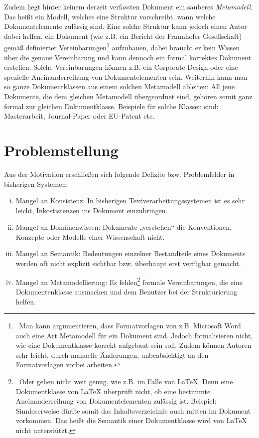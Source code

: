  
Zudem liegt hinter keinem derzeit verfassten Dokument ein sauberes \emph{Metamodell}. Das heißt ein Modell, welches eine Struktur vorschreibt, wann welche Dokumentelemente zulässig sind. Eine solche Struktur kann jedoch einen Autor dabei helfen, ein Dokument (wie z.B. ein Bericht der Fraunhofer Gesellschaft) gemäß definierter Vereinbarungen\footnote{~Man kann argumentieren, dass Formatvorlagen von z.B. Microsoft Word auch eine Art Metamodell für ein Dokument sind. Jedoch formalisieren nicht, wie eine Dokumentklasse korrekt aufgebaut sein soll. Zudem können Autoren sehr leicht, durch manuelle Änderungen, unbeabsichtigt an den Formatvorlagen vorbei arbeiten.} aufzubauen, dabei braucht er kein Wissen über die genaue Vereinbarung und kann dennoch ein formal korrektes Dokument erstellen. Solche Vereinbarungen können z.B. ein Corporate Design oder eine spezielle Aneinanderreihung von Dokumentelementen sein. Weiterhin kann man so ganze Dokumentklassen aus einem solchen Metamodell ableiten: All jene Dokumente, die dem gleichen Metamodell übergeordnet sind, gehören somit ganz formal zur gleichen Dokumentklasse. Beispiele für solche Klassen sind: Masterarbeit, Journal-Paper oder EU-Patent etc.

 
\section{Problemstellung}\label{problemstellung}
 
Aus der Motivation erschließen sich folgende Defizite bzw. Problemfelder in bisherigen Systemen:

 
\begin{enumerate}[(i)]

\item
Mangel an Konsistenz: In bisherigen Textverarbeitungssystemen ist es sehr leicht, Inkostistenzen ins Dokument einzubringen.


\item
Mangel an Domänenwissen: Dokumente „verstehen“ die Konventionen, Konzepte oder Modelle einer Wissenschaft nicht.


\item
Mangel an Semantik: Bedeutungen einzelner Bestandteile eines Dokuments werden oft nicht explizit sichtbar bzw. überhaupt erst verfügbar gemacht.


\item
Mangel an Metamodellierung: Es fehlen\footnote{~Oder gehen nicht weit genug, wie z.B. im Falle von LaTeX. Denn eine Dokumentklasse von LaTeX überprüft nicht, ob eine bestimmte Aneinanderreihung von Dokumentelementen zulässig ist. Beispiel: Sinnloserweise dürfte somit das Inhaltsverzeichnis auch mitten im Dokument vorkommen. Das heißt die Semantik einer Dokumentklasse wird von LaTeX nicht unterstützt.} formale Vereinbarungen, die eine Dokumentenklasse ausmachen und dem Benutzer bei der Strukturierung helfen.


\end{enumerate}
 
